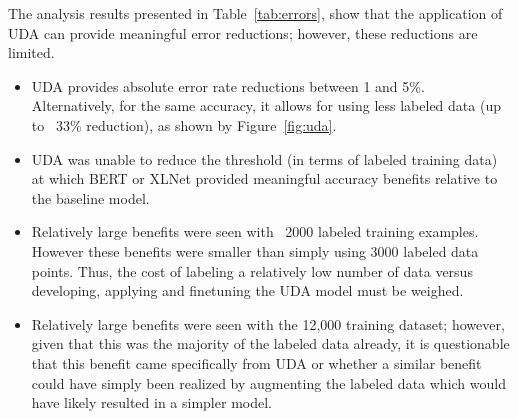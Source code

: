\documentclass[twoside,twocolumn,10pt]{article}
\begin{document}
The analysis results presented in Table~\ref{tab:errors}, show that the application of UDA can provide meaningful error reductions; however, these reductions are limited. 
\begin{itemize}
\item UDA provides absolute error rate reductions between 1 and 5\%. Alternatively, for the same accuracy, it allows for using less labeled data (up to ~33\% reduction), as shown by Figure~\ref{fig:uda}.
\item UDA was unable to reduce the threshold (in terms of labeled training data) at which BERT or XLNet provided meaningful accuracy benefits relative to the baseline model. 
\item Relatively large benefits were seen with ~2000 labeled training examples. However these benefits were smaller than simply using 3000 labeled data points. Thus, the cost of labeling a relatively low number of data versus developing, applying and finetuning the UDA model must be weighed.
\item Relatively large benefits were seen with the 12,000 training dataset; however, given that this was the majority of the labeled data already, it is questionable that this benefit came specifically from UDA or whether a similar benefit could have simply been realized by augmenting the labeled data which would have likely resulted in a simpler model.
\end{itemize}
\end{document}
